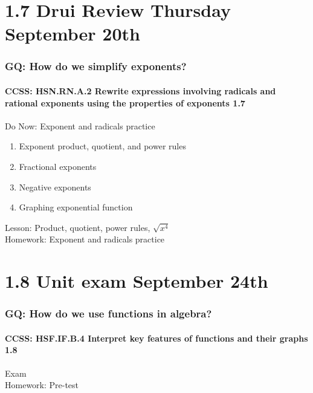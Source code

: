 \documentclass{beamer}
\begin{document}
\section{1.7 Drui Review Thursday September 20th}
  \frame
  {
    \frametitle{GQ: How do we simplify exponents?}
    \framesubtitle{CCSS: HSN.RN.A.2 Rewrite expressions involving radicals and rational exponents using the properties of exponents  \alert{1.7}}

    \begin{block}{Do Now: Exponent and radicals practice}
      \begin{enumerate}
      \item Exponent product, quotient, and power rules
      \item Fractional exponents
      \item Negative exponents
      \item Graphing exponential function
      \end{enumerate}
   \end{block}
    Lesson: Product, quotient, power rules, $\sqrt{x^4}$ \\ \bigskip
    Homework: Exponent and radicals practice
  }

\section{1.8 Unit exam September 24th}
  \frame
  {
    \frametitle{GQ: How do we use functions in algebra?}
    \framesubtitle{CCSS: HSF.IF.B.4 Interpret key features of functions and their graphs  \alert{1.8}}

  Exam \\ \bigskip
  Homework: Pre-test
  }

  
\end{document}
